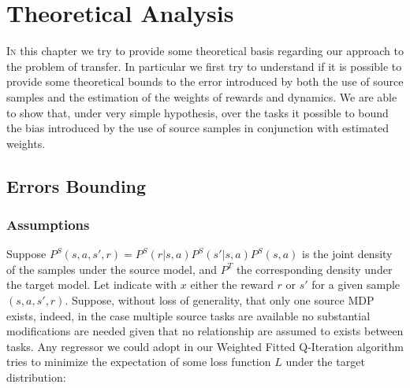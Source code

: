 \chapter{Theoretical Analysis}
  \lettrine[lines=2]{I}n this chapter we try to provide some theoretical basis regarding our approach to
  the problem of transfer. In particular we first try to understand if it is possible to provide some
  theoretical bounds to the error introduced by both the use of source samples and the estimation of the
  weights of rewards and dynamics. We are able to show that, under very simple hypothesis, over the tasks
  it possible to bound the bias introduced by the use of source samples in conjunction with estimated weights.

  \section{Errors Bounding}
    \subsection{Assumptions}
      \noindent Suppose $P^{S}(s,a,s',r) = P^{S}(r|s,a)P^{S}(s'|s,a)P^{S}(s,a)$ is the joint density of the samples
      under the source model, and $P^{T}$ the corresponding density under the target model. Let indicate with $x$ either
      the reward $r$ or $s'$ for a given sample $(s,a,s',r)$.
      Suppose, without loss of generality, that only one source MDP exists, indeed, in the case multiple
      source tasks are available no substantial modifications are needed given that no relationship are
      assumed to exists between tasks.
      Any regressor we could adopt in our Weighted Fitted Q-Iteration algorithm tries to minimize the expectation
      of some loss function $L$ under the target distribution:

